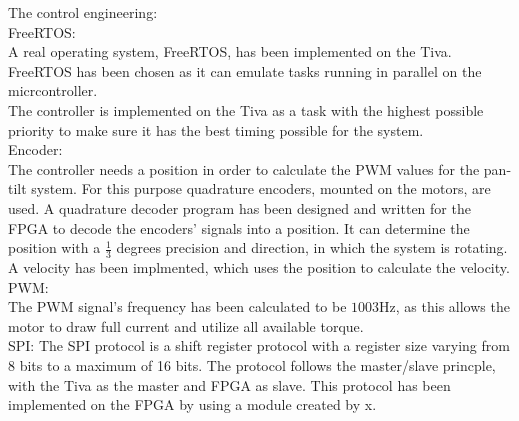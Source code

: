 \documentclass[../../main]{subfiles}
\begin{document}
The control engineering: \\

FreeRTOS:\\
A real operating system, FreeRTOS, has been implemented on the Tiva. FreeRTOS has been chosen as it can emulate tasks running in parallel on the micrcontroller. \\
The controller is implemented on the Tiva as a task with the highest possible priority to make sure it has the best timing possible for the system.
\\

Encoder:\\
The controller needs a position in order to calculate the PWM values for the pan-tilt system. For this purpose quadrature encoders, mounted on the motors, are used.
A quadrature decoder program has been designed and written for the FPGA to decode the encoders' signals into a position.
It can determine the position with a $\frac{1}{3}$ degrees precision and direction, in which the system is rotating. A velocity has been implmented, which uses the position to calculate the velocity.
\\

PWM:\\
The PWM signal's frequency has been calculated to be $1003$Hz, as this allows the motor to draw full current and utilize all available torque. \\

SPI:
The SPI protocol is a shift register protocol with a register size varying from 8 bits to a maximum of 16 bits. The protocol follows the master/slave princple, with the Tiva as the master and FPGA as slave. This protocol has been implemented on the FPGA by using a module created by x. 
\end{document}
